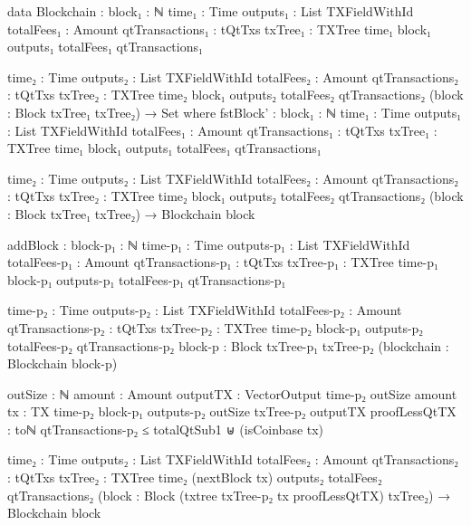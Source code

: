 \documentclass{beamer}
\begin{document}
\begin{code}
      data Blockchain :
        {block₁ : ℕ}
        {time₁ : Time}
        {outputs₁ : List TXFieldWithId}
        {totalFees₁ : Amount}
        {qtTransactions₁ : tQtTxs}
        {txTree₁ : TXTree time₁ block₁ outputs₁ totalFees₁ qtTransactions₁}

        {time₂ : Time}
        {outputs₂ : List TXFieldWithId}
        {totalFees₂ : Amount}
        {qtTransactions₂ : tQtTxs}
        {txTree₂ : TXTree time₂ block₁ outputs₂ totalFees₂ qtTransactions₂}
        (block : Block txTree₁ txTree₂)
        → Set where
          fstBlock' :
            {block₁ : ℕ}
            {time₁ : Time}
            {outputs₁ : List TXFieldWithId}
            {totalFees₁ : Amount}
            {qtTransactions₁ : tQtTxs}
            {txTree₁ : TXTree time₁ block₁ outputs₁ totalFees₁ qtTransactions₁}

            {time₂ : Time}
            {outputs₂ : List TXFieldWithId}
            {totalFees₂ : Amount}
            {qtTransactions₂ : tQtTxs}
            {txTree₂ : TXTree time₂ block₁ outputs₂ totalFees₂ qtTransactions₂}
            (block : Block txTree₁ txTree₂)
            → Blockchain block

          addBlock :
            {block-p₁ : ℕ}
            {time-p₁ : Time}
            {outputs-p₁ : List TXFieldWithId}
            {totalFees-p₁ : Amount}
            {qtTransactions-p₁ : tQtTxs}
            {txTree-p₁ : TXTree time-p₁ block-p₁ outputs-p₁ totalFees-p₁ qtTransactions-p₁}

            {time-p₂ : Time}
            {outputs-p₂ : List TXFieldWithId}
            {totalFees-p₂ : Amount}
            {qtTransactions-p₂ : tQtTxs}
            {txTree-p₂ : TXTree time-p₂ block-p₁ outputs-p₂ totalFees-p₂ qtTransactions-p₂}
            {block-p : Block txTree-p₁ txTree-p₂}
            (blockchain : Blockchain block-p)

            {outSize : ℕ}
            {amount : Amount}
            {outputTX : VectorOutput time-p₂ outSize amount}
            {tx : TX {time-p₂} {block-p₁} {outputs-p₂} {outSize} txTree-p₂ outputTX}
            {proofLessQtTX :
                toℕ qtTransactions-p₂ ≤ totalQtSub1
                ⊎
                (isCoinbase tx)}

            {time₂ : Time}
            {outputs₂ : List TXFieldWithId}
            {totalFees₂ : Amount}
            {qtTransactions₂ : tQtTxs}
            {txTree₂ : TXTree time₂ (nextBlock tx) outputs₂ totalFees₂ qtTransactions₂}
            (block : Block (txtree txTree-p₂ tx proofLessQtTX) txTree₂)
            → Blockchain block


\end{code}
\end{document}
